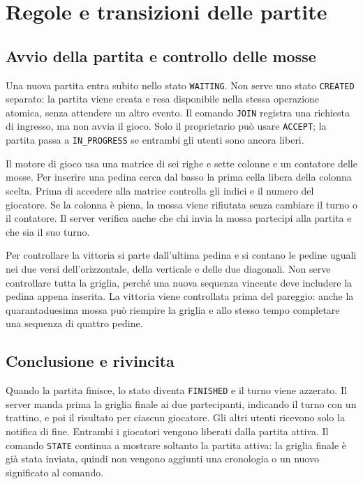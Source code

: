 \documentclass[11pt,a4paper]{article}
\begin{document}
\clearpage

\section{Regole e transizioni delle partite}

\subsection{Avvio della partita e controllo delle mosse}

Una nuova partita entra subito nello stato \texttt{WAITING}. Non serve uno stato \texttt{CREATED} separato: la partita viene creata e resa disponibile nella stessa operazione atomica, senza attendere un altro evento. Il comando \texttt{JOIN} registra una richiesta di ingresso, ma non avvia il gioco. Solo il proprietario può usare \texttt{ACCEPT}; la partita passa a \texttt{IN\_PROGRESS} se entrambi gli utenti sono ancora liberi.

Il motore di gioco usa una matrice di sei righe e sette colonne e un contatore delle mosse. Per inserire una pedina cerca dal basso la prima cella libera della colonna scelta. Prima di accedere alla matrice controlla gli indici e il numero del giocatore. Se la colonna è piena, la mossa viene rifiutata senza cambiare il turno o il contatore. Il server verifica anche che chi invia la mossa partecipi alla partita e che sia il suo turno.

Per controllare la vittoria si parte dall'ultima pedina e si contano le pedine uguali nei due versi dell'orizzontale, della verticale e delle due diagonali. Non serve controllare tutta la griglia, perché una nuova sequenza vincente deve includere la pedina appena inserita. La vittoria viene controllata prima del pareggio: anche la quarantaduesima mossa può riempire la griglia e allo stesso tempo completare una sequenza di quattro pedine.

\subsection{Conclusione e rivincita}

Quando la partita finisce, lo stato diventa \texttt{FINISHED} e il turno viene azzerato. Il server manda prima la griglia finale ai due partecipanti, indicando il turno con un trattino, e poi il risultato per ciascun giocatore. Gli altri utenti ricevono solo la notifica di fine. Entrambi i giocatori vengono liberati dalla partita attiva. Il comando \texttt{STATE} continua a mostrare soltanto la partita attiva: la griglia finale è già stata inviata, quindi non vengono aggiunti una cronologia o un nuovo significato al comando.
\end{document}
